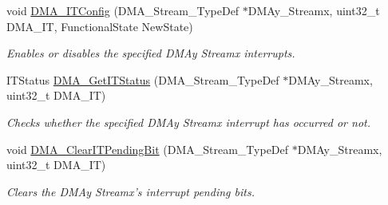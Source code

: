 \begin{DoxyCompactItemize}
void \hyperlink{group___d_m_a___group4_gab9c469a3f5d4aca5c97dee798ffc2f05}{D\-M\-A\-\_\-\-I\-T\-Config} (D\-M\-A\-\_\-\-Stream\-\_\-\-Type\-Def $\ast$D\-M\-Ay\-\_\-\-Streamx, uint32\-\_\-t D\-M\-A\-\_\-\-I\-T, Functional\-State New\-State)
\begin{DoxyCompactList}\small\item\em Enables or disables the specified D\-M\-Ay Streamx interrupts. \end{DoxyCompactList}\item 
I\-T\-Status \hyperlink{group___d_m_a___group4_gad0ccf5f6548bd7cf8f2cae30393bb716}{D\-M\-A\-\_\-\-Get\-I\-T\-Status} (D\-M\-A\-\_\-\-Stream\-\_\-\-Type\-Def $\ast$D\-M\-Ay\-\_\-\-Streamx, uint32\-\_\-t D\-M\-A\-\_\-\-I\-T)
\begin{DoxyCompactList}\small\item\em Checks whether the specified D\-M\-Ay Streamx interrupt has occurred or not. \end{DoxyCompactList}\item 
void \hyperlink{group___d_m_a___group4_gad5433018889cd36140d98bb380c4e76e}{D\-M\-A\-\_\-\-Clear\-I\-T\-Pending\-Bit} (D\-M\-A\-\_\-\-Stream\-\_\-\-Type\-Def $\ast$D\-M\-Ay\-\_\-\-Streamx, uint32\-\_\-t D\-M\-A\-\_\-\-I\-T)
\begin{DoxyCompactList}\small\item\em Clears the D\-M\-Ay Streamx's interrupt pending bits. \end{DoxyCompactList}\end{DoxyCompactItemize}


